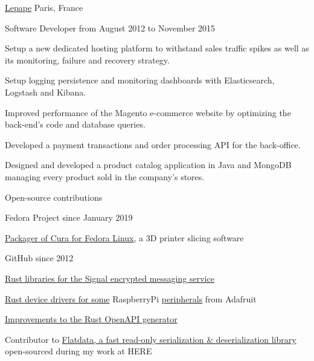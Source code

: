 \documentclass[10pt, a4paper]{awesome-cv}
\begin{document}
\begin{cventries}

	\cventrytitle
	{\href{https://www.lepape.com}{Lepape}}
	{Paris, France}

	\cventry
	{Software Developer}
	{from August 2012 to November 2015}
	{
		\begin{cvitems}
			\item {Setup a new dedicated hosting platform to withstand sales traffic spikes as well as its monitoring, failure and recovery strategy.}
			\item {Setup logging persistence and monitoring dashboards with Elasticsearch, Logstash and Kibana.}
			\item {Improved performance of the Magento e-commerce website by optimizing the back-end's code and database queries.}
			\item {Developed a payment transactions and order processing API for the back-office.}
			\item {Designed and developed a product catalog application in Java and MongoDB managing every product sold in the company's stores.}
		\end{cvitems}
	}
\end{cventries}
\vspace{6pt}

\begin{cventries}
	\cventrytitle
	{Open-source contributions}
	{}

	\cventry
	{Fedora Project}
	{since January 2019}
	{
		\begin{cvitems}
			\item{\href{https://src.fedoraproject.org/rpms/cura}{Packager of Cura for Fedora Linux}, a 3D printer slicing software}
		\end{cvitems}
	}

	\cventry
	{GitHub}
	{since 2012}
	{
		\begin{cvitems}
			\item {\href{https://github.com/whisperfish}{Rust libraries for the Signal encrypted messaging service}}
			\item {\href{https://github.com/gferon/rustberrypi-playground}{Rust device drivers for some} RaspberryPi \href{https://github.com/gferon/am2320.rs}{peripherals} from Adafruit}
			\item {\href{https://github.com/OpenAPITools/openapi-generator/pulls?q=is\%3Apr+author\%3Agferon+is\%3Aclosed}{Improvements to the Rust OpenAPI generator}}
			\item {Contributor to \href{https://github.com/heremaps/flatdata}{Flatdata, a fast read-only serialization \& deserialization library} open-sourced during my work at HERE}
		\end{cvitems}
	}
\end{cventries}
\vspace{6pt}
\end{document}
